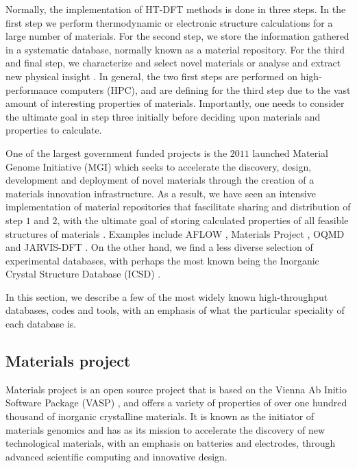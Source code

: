 Normally, the implementation of HT-DFT methods is done in three steps. In the first step we perform thermodynamic or electronic structure calculations for a large number of materials. For the second step, we store the information gathered in a systematic database, normally known as a material repository. For the third and final step, we characterize and select novel materials or analyse and extract new physical insight \cite{Schleder2019}. In general, the two first steps are performed on high-performance computers (HPC), and are defining for the third step due to the vast amount of interesting properties of materials. Importantly, one needs to consider the ultimate goal in step three initially before deciding upon materials and properties to calculate.

One of the largest government funded projects is the $2011$ launched Material Genome Initiative (MGI) \cite{Warren2018} which seeks to accelerate the discovery, design, development and deployment of novel materials through the creation of a materials innovation infrastructure. As a result, we have seen an intensive implementation of material repositories that fascilitate sharing and distribution of step $1$ and $2$, with the ultimate goal of storing calculated properties of all feasible structures of materials \cite{Schuett2020}. Examples include AFLOW \cite{Curtarolo2012, Curtarolo2012a, Calderon2015}, Materials Project \cite{Jain2013}, OQMD \cite{Saal2013, Kirklin2015} and JARVIS-DFT \cite{Choudhary2020}. On the other hand, we find a less diverse selection of experimental databases, with perhaps the most known being the Inorganic Crystal Structure Database (ICSD) \cite{Allen1987}.

In this section, we describe a few of the most widely known high-throughput databases, codes and tools, with an emphasis of what the particular speciality of each database is.

\subsection{Materials project}

Materials project \cite{Jain2013, Jain2018} is an open source project that is based on the Vienna Ab Initio Software Package (VASP) \cite{Kresse1996}, and offers a variety of properties of over one hundred thousand of inorganic crystalline materials. It is known as the initiator of materials genomics and has as its mission to accelerate the discovery of new technological materials, with an emphasis on batteries and electrodes, through advanced scientific computing and innovative design.

